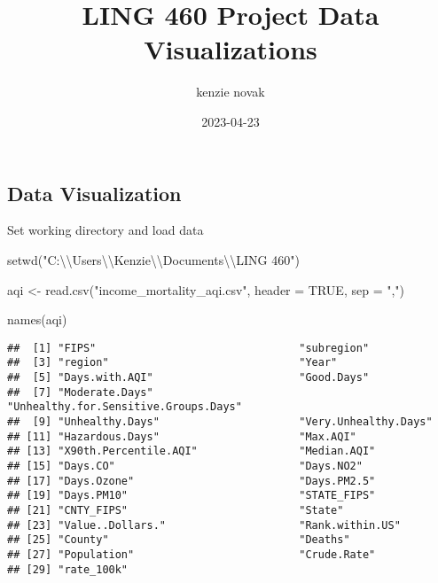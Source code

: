 \documentclass[
]{article}
\title{LING 460 Project Data Visualizations}
\author{kenzie novak}
\date{2023-04-23}
\newenvironment{Shaded}{\begin{snugshade}}{\end{snugshade}}
\newcommand{\AttributeTok}[1]{\textcolor[rgb]{0.77,0.63,0.00}{#1}}
\newcommand{\ConstantTok}[1]{\textcolor[rgb]{0.00,0.00,0.00}{#1}}
\newcommand{\FunctionTok}[1]{\textcolor[rgb]{0.00,0.00,0.00}{#1}}
\newcommand{\NormalTok}[1]{#1}
\newcommand{\OtherTok}[1]{\textcolor[rgb]{0.56,0.35,0.01}{#1}}
\newcommand{\SpecialCharTok}[1]{\textcolor[rgb]{0.00,0.00,0.00}{#1}}
\newcommand{\StringTok}[1]{\textcolor[rgb]{0.31,0.60,0.02}{#1}}
\begin{document}
\maketitle

\hypertarget{data-visualization}{%
\subsection{Data Visualization}\label{data-visualization}}

Set working directory and load data

\begin{Shaded}
\begin{Highlighting}[]
\FunctionTok{setwd}\NormalTok{(}\StringTok{"C:}\SpecialCharTok{\textbackslash{}\textbackslash{}}\StringTok{Users}\SpecialCharTok{\textbackslash{}\textbackslash{}}\StringTok{Kenzie}\SpecialCharTok{\textbackslash{}\textbackslash{}}\StringTok{Documents}\SpecialCharTok{\textbackslash{}\textbackslash{}}\StringTok{LING 460"}\NormalTok{)}

\NormalTok{aqi }\OtherTok{\textless{}{-}} \FunctionTok{read.csv}\NormalTok{(}\StringTok{"income\_mortality\_aqi.csv"}\NormalTok{, }\AttributeTok{header =} \ConstantTok{TRUE}\NormalTok{, }\AttributeTok{sep =} \StringTok{","}\NormalTok{)}

\FunctionTok{names}\NormalTok{(aqi)}
\end{Highlighting}
\end{Shaded}

\begin{verbatim}
##  [1] "FIPS"                                "subregion"                          
##  [3] "region"                              "Year"                               
##  [5] "Days.with.AQI"                       "Good.Days"                          
##  [7] "Moderate.Days"                       "Unhealthy.for.Sensitive.Groups.Days"
##  [9] "Unhealthy.Days"                      "Very.Unhealthy.Days"                
## [11] "Hazardous.Days"                      "Max.AQI"                            
## [13] "X90th.Percentile.AQI"                "Median.AQI"                         
## [15] "Days.CO"                             "Days.NO2"                           
## [17] "Days.Ozone"                          "Days.PM2.5"                         
## [19] "Days.PM10"                           "STATE_FIPS"                         
## [21] "CNTY_FIPS"                           "State"                              
## [23] "Value..Dollars."                     "Rank.within.US"                     
## [25] "County"                              "Deaths"                             
## [27] "Population"                          "Crude.Rate"                         
## [29] "rate_100k"
\end{verbatim}
\end{document}
